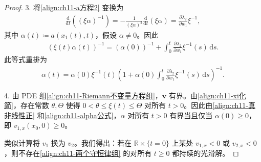 \documentclass[../../main.tex]{subfiles}
\begin{document}
\begin{proof}
3. 将\eqref{align:ch11-a方程2} 变换为
\begin{align*}
\frac{\mathrm{d}}{\mathrm{d}t}((\xi\alpha)^{-1})=-\frac{1}{(\xi\alpha)^2}\frac{\mathrm{d}}{\mathrm{d}t}(\xi\alpha)=\frac{\partial\lambda_2}{\partial w_1}\xi^{-1},
\end{align*}
其中 $\alpha(t)\coloneqq a(x_1(t),t)$，假设 $\alpha\neq 0$。因此
\begin{align*}
(\xi(t)\alpha(t))^{-1}=(\alpha(0))^{-1}+\int_0^t\frac{\partial\lambda_2}{\partial w_1}\xi^{-1}(s)\,\mathrm{d}s.
\end{align*}
此等式重排为
\begin{align}
\alpha(t)=\alpha(0)\xi^{-1}(t)\left(1+\alpha(0)\int_0^t\frac{\partial\lambda_2}{\partial w_1}\xi^{-1}(s)\,\mathrm{d}s\right)^{-1}.
\label{align:ch11-alpha公式}
\end{align}

4. 由 PDE 组\eqref{align:ch11-Riemann不变量方程组}，$\mathbf{v}$ 有界。由\eqref{align:ch11-xi化简}，存在常数 $\theta,\Theta$ 使得 $0<\theta\leqslant\xi(t)\leqslant\Theta$ 对所有 $t>0$。因此由\eqref{align:ch11-真非线性正} 和\eqref{align:ch11-alpha公式}，$\alpha$ 对所有 $t>0$ 有界当且仅当 $\alpha(0)\geqslant 0$，即 $v_{1,x}(x_0,0)\geqslant 0$。

类似计算将 $v_1$ 换为 $v_2$。我们得出：若在 $\mathbb{R}\times\{t=0\}$ 上某处 $v_{1,x}<0$ 或 $v_{2,x}<0$，则不存在\eqref{align:ch11-两个守恒律组} 的对所有 $t\geqslant 0$ 都持续的光滑解。
\end{proof}
\end{document}
